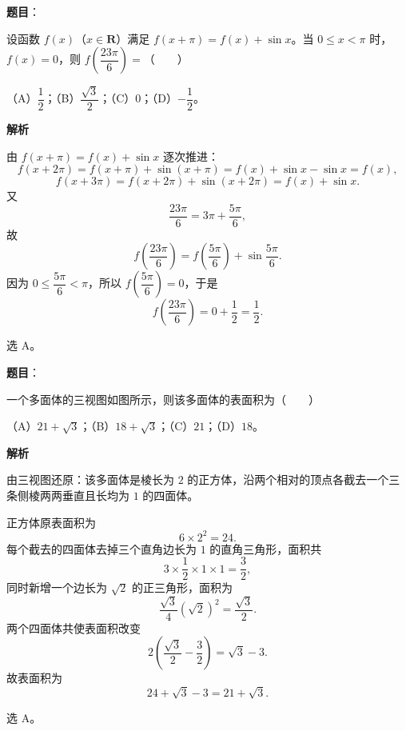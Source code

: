 \begin{answer}

\textbf{题目}：

设函数 $f(x)$（$x\in\mathbf R$）满足 $f(x+\pi)=f(x)+\sin x$。当 $0\leqslant x<\pi$ 时，$f(x)=0$，则 $f\left(\dfrac{23\pi}6\right)=$\mbox{（　　）}

（A）$\dfrac12$；（B）$\dfrac{\sqrt3}2$；（C）$0$；（D）$-\dfrac12$。

\textbf{解析}

由 $f(x+\pi)=f(x)+\sin x$ 逐次推进：
\nopagebreak[4]
\[f(x+2\pi)=f(x+\pi)+\sin(x+\pi)=f(x)+\sin x-\sin x=f(x),\]
\nopagebreak[4]
\[f(x+3\pi)=f(x+2\pi)+\sin(x+2\pi)=f(x)+\sin x .\]
又
\nopagebreak[4]
\[\frac{23\pi}6=3\pi+\frac{5\pi}6,\]
故
\nopagebreak[4]
\[f\left(\frac{23\pi}6\right)=f\left(\frac{5\pi}6\right)+\sin\frac{5\pi}6 .\]
因为 $0\leqslant\dfrac{5\pi}6<\pi$，所以 $f\left(\dfrac{5\pi}6\right)=0$，于是
\nopagebreak[4]
\[f\left(\frac{23\pi}6\right)=0+\frac12=\frac12 .\]

选 A。


\end{answer}
\begin{answer}

\textbf{题目}：

一个多面体的三视图如图所示，则该多面体的表面积为\mbox{（　　）}

（A）$21+\sqrt3$；（B）$18+\sqrt3$；（C）$21$；（D）$18$。
\nopagebreak[4]
\begin{center}\end{center}
\nopagebreak[4]
\textbf{解析}

由三视图还原：该多面体是棱长为 $2$ 的正方体，沿两个相对的顶点各截去一个三条侧棱两两垂直且长均为 $1$ 的四面体。

正方体原表面积为
\nopagebreak[4]
\[6\times2^2=24 .\]
每个截去的四面体去掉三个直角边长为 $1$ 的直角三角形，面积共
\nopagebreak[4]
\[3\times\frac12\times1\times1=\frac32,\]
同时新增一个边长为 $\sqrt2$ 的正三角形，面积为
\nopagebreak[4]
\[\frac{\sqrt3}4(\sqrt2)^2=\frac{\sqrt3}2 .\]
两个四面体共使表面积改变
\nopagebreak[4]
\[2\left(\frac{\sqrt3}2-\frac32\right)=\sqrt3-3 .\]
故表面积为
\nopagebreak[4]
\[24+\sqrt3-3=21+\sqrt3 .\]

选 A。


\end{answer}
